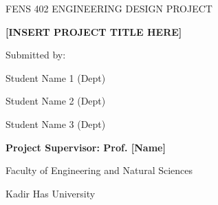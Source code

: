 \begin{titlepage}
    \centering
    \thispagestyle{empty} %
    
    \vspace*{1cm}
    {\fontsize{14}{17}\selectfont FENS 402 ENGINEERING DESIGN PROJECT\par}
    
    \vspace{3.5cm}
    {\fontsize{14}{17}\bfseries [INSERT PROJECT TITLE HERE]\par}
    
    \vspace{3.5cm}
    {\fontsize{12}{15}\selectfont Submitted by:\par}
    {\fontsize{12}{15}\selectfont Student Name 1 (Dept)\par}
    {\fontsize{12}{15}\selectfont Student Name 2 (Dept)\par}
    {\fontsize{12}{15}\selectfont Student Name 3 (Dept)\par}
    
    \vspace{3cm}
    {\fontsize{12}{15}\bfseries Project Supervisor: Prof. [Name]\par}
    
    \vfill
    
    {\fontsize{12}{15}\selectfont Faculty of Engineering and Natural Sciences\par}
    {\fontsize{12}{15}\selectfont Kadir Has University\par}
    {\fontsize{12}{15}\selectfont \DTMmonthname{\month} \the\year\par} 
\end{titlepage}